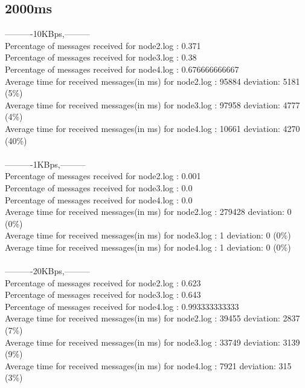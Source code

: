    \subsection{2000ms}\label{RawResults:2000ms}
        ----------10KBps,---------\\
        Percentage of messages received for node2.log : 0.371\\
        Percentage of messages received for node3.log : 0.38\\
        Percentage of messages received for node4.log : 0.676666666667\\
        Average time for received messages(in ms) for  node2.log : 95884 	deviation: 5181 (5\%)\\
        Average time for received messages(in ms) for  node3.log : 97958 	deviation: 4777 (4\%)\\
        Average time for received messages(in ms) for  node4.log : 10661 	deviation: 4270 (40\%)\\\\
        ----------1KBps,---------\\
        Percentage of messages received for node2.log : 0.001\\
        Percentage of messages received for node3.log : 0.0\\
        Percentage of messages received for node4.log : 0.0\\
        Average time for received messages(in ms) for  node2.log : 279428 	deviation: 0 (0\%)\\
        Average time for received messages(in ms) for  node3.log : 1 	deviation: 0 (0\%)\\
        Average time for received messages(in ms) for  node4.log : 1 	deviation: 0 (0\%)\\\\
        ----------20KBps,---------\\
        Percentage of messages received for node2.log : 0.623\\
        Percentage of messages received for node3.log : 0.643\\
        Percentage of messages received for node4.log : 0.993333333333\\
        Average time for received messages(in ms) for  node2.log : 39455 	deviation: 2837 (7\%)\\
        Average time for received messages(in ms) for  node3.log : 33749 	deviation: 3139 (9\%)\\
        Average time for received messages(in ms) for  node4.log : 7921 	deviation: 315 (3\%)\\\\
